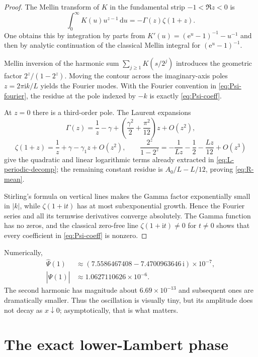 \documentclass[11pt]{article}
\numberwithin{equation}{section}
\theoremstyle{definition}
\theoremstyle{remark}
\newcommand{\dd}{\,\mathrm{d}}
\newcommand{\e}{\mathrm{e}}
\newcommand{\ii}{\mathrm{i}}
\begin{document}
\begin{proof}
The Mellin transform of $K$ in the fundamental strip $-1<\Re z<0$ is
\begin{equation}\label{eq:Mellin-K}
 \int_0^\infty K(u)u^{z-1}\dd u
 =-\Gamma(z)\zeta(1+z).
\end{equation}
One obtains this by integration by parts from
$K'(u)=(\e^u-1)^{-1}-u^{-1}$ and then by analytic continuation of the
classical Mellin integral for $(\e^u-1)^{-1}$.

Mellin inversion of the harmonic sum
$\sum_{j\ge1}K(s/2^j)$ introduces the geometric factor
$2^z/(1-2^z)$.  Moving the contour across the imaginary-axis poles
$z=2\pi\ii k/L$ yields the Fourier modes.  With the Fourier convention in
\eqref{eq:Psi-fourier}, the residue at the pole indexed by $-k$ is exactly
\eqref{eq:Psi-coeff}.

At $z=0$ there is a third-order pole.  The Laurent expansions
\[
 \Gamma(z)=\frac1z-\gamma+
 \left(\frac{\gamma^2}{2}+\frac{\pi^2}{12}\right)z+O(z^2),
\]
\[
 \zeta(1+z)=\frac1z+\gamma-\gamma_1z+O(z^2),
 \qquad
 \frac{2^z}{1-2^z}=-\frac1{Lz}-\frac12-\frac{Lz}{12}+O(z^3)
\]
give the quadratic and linear logarithmic terms already extracted in
\eqref{eq:L-periodic-decomp}; the remaining constant residue is
$A_0/L-L/12$, proving \eqref{eq:R-mean}.

Stirling's formula on vertical lines makes the Gamma factor exponentially
small in $|k|$, while $\zeta(1+\ii t)$ has at most subexponential growth.
Hence the Fourier series and all its termwise derivatives converge
absolutely.  The Gamma function has no zeros, and the classical zero-free
line $\zeta(1+\ii t)\ne0$ for $t\ne0$ shows that every coefficient in
\eqref{eq:Psi-coeff} is nonzero.
\end{proof}

Numerically,
\begin{align}
 \widehat\Psi(1)
 &\approx(7.5586467408-7.4700963646\,\ii)\times10^{-7},
 \label{eq:first-psi-numeric}\\
 |\widehat\Psi(1)|&\approx1.0627110626\times10^{-6}.
\end{align}
The second harmonic has magnitude about $6.69\times10^{-13}$ and subsequent
ones are dramatically smaller.  Thus the oscillation is visually tiny, but
its amplitude does not decay as $x\downarrow0$; asymptotically, that is what
matters.

\section{The exact lower-Lambert phase}\label{sec:lambert-phase}
\end{document}
